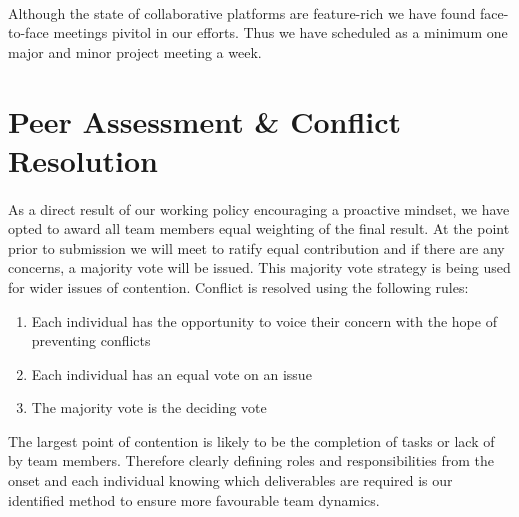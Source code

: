 \documentclass[11pt,a4paper]{article}
\begin{document}
\paragraph{}
Although the state of collaborative platforms are feature-rich we have found face-to-face meetings pivitol in our efforts.  Thus we have scheduled as a minimum one major and minor project meeting a week.

\section{Peer Assessment \& Conflict Resolution}
\paragraph{}
As a direct result of our working policy encouraging a proactive mindset, we have opted to award all team members equal weighting of the final result.  At the point prior to submission we will meet to ratify equal contribution and if there are any concerns, a majority vote will be issued.
This majority vote strategy is being used for wider issues of contention.  Conflict is resolved using the following rules:

\begin{enumerate}
  \item Each individual has the opportunity to voice their concern with the hope of preventing conflicts
  \item Each individual has an equal vote on an issue
  \item The majority vote is the deciding vote
\end{enumerate}

The largest point of contention is likely to be the completion of tasks or lack of by team members.  Therefore clearly defining roles and responsibilities from the onset and each individual knowing which deliverables are required is our identified method to ensure more favourable team dynamics.
\end{document}

